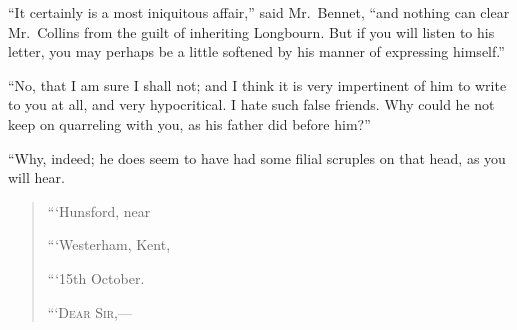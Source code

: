 \documentclass[12pt,english,oneside]{book}
\newcommand{\noun}[1]{\textsc{#1}}
\begin{document}
{}``It certainly is a most iniquitous affair,'' said Mr.\ Bennet,
{}``and nothing can clear Mr.\ Collins from the guilt of inheriting
Longbourn. But if you will listen to his letter, you may perhaps be
a little softened by his manner of expressing himself.''

{}``No, that I am sure I shall not; and I think it is very impertinent
of him to write to you at all, and very hypocritical. I hate such
false friends. Why could he not keep on quarreling with you, as his
father did before him?''\ 

{}``Why, indeed; he does seem to have had some filial scruples on
that head, as you will hear.

\begin{quotation}
```Hunsford, near

```Westerham, Kent,

```15th October.

\noindent {}``\noun{`Dear Sir},\mbox{---}


\end{quotation}
\end{document}
